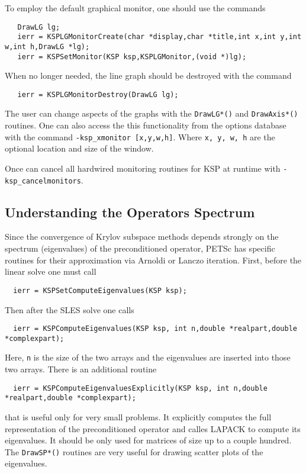 To employ the default graphical monitor, one should use the 
commands  
\begin{verbatim}
   DrawLG lg;
   ierr = KSPLGMonitorCreate(char *display,char *title,int x,int y,int w,int h,DrawLG *lg);
   ierr = KSPSetMonitor(KSP ksp,KSPLGMonitor,(void *)lg);
\end{verbatim}
When no longer needed, the line graph should be destroyed 
with the command
\begin{verbatim}
   ierr = KSPLGMonitorDestroy(DrawLG lg);
\end{verbatim}
The user can change aspects of the graphs with the {\tt DrawLG*()} and 
{\tt DrawAxis*()} routines.  
One can also access the this functionality from the options database 
with the command {\tt -ksp\_xmonitor [x,y,w,h]}.  
Where {\tt x, y, w, h} are the optional location and size of the window.

Once can cancel all hardwired monitoring routines for KSP at runtime with 
{\tt -ksp\_cancelmonitors}. 

\subsection{Understanding the Operators Spectrum}
Since the convergence of Krylov subspace methods depends strongly on 
the spectrum (eigenvalues) of the preconditioned operator, PETSc has specific
routines for their approximation via Arnoldi or Lanczo iteration.
First, before the linear solve one must call 
\begin{verbatim}
  ierr = KSPSetComputeEigenvalues(KSP ksp);
\end{verbatim}
Then after the SLES solve one calls 
\begin{verbatim}
  ierr = KSPComputeEigenvalues(KSP ksp, int n,double *realpart,double *complexpart);
\end{verbatim}
Here, {\tt n} is the size of the two arrays and the eigenvalues are 
inserted into those two arrays. 
There is an additional routine 
\begin{verbatim}
  ierr = KSPComputeEigenvaluesExplicitly(KSP ksp, int n,double *realpart,double *complexpart);
\end{verbatim}
that is useful only for very small problems. It explicitly computes the 
full representation of the preconditioned operator and calles LAPACK to 
compute its eigenvalues. It should be only used for matrices of size up to 
a couple hundred.  The {\tt DrawSP*()} routines are very useful for 
drawing scatter plots of the eigenvalues. 

